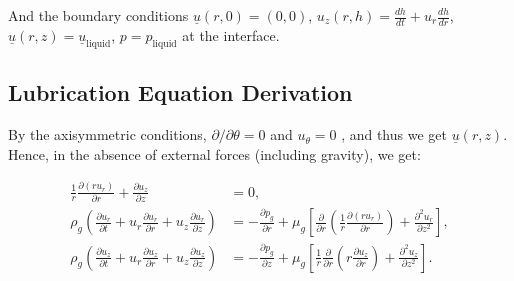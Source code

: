 \documentclass[11pt,a4paper]{article}
\begin{document}
	And the boundary conditions $\underline{u}(r,0) = (0,0)$, $u_z(r,h) = \frac{dh}{dt} + u_r \frac{dh}{dr}$, $\underline{u}(r,z) = \underline{u}_\text{liquid}$, $p = p_\text{liquid}$ at the interface.
	
	
	
	
	\subsection{Lubrication Equation Derivation}
	By the axisymmetric conditions, $\partial / \partial \theta = 0$ and $u_\theta = 0$ , and thus we get $\underline{u}(r,z)$. Hence, in the absence of external forces (including gravity), we get:
	
	\begin{subequations}\label{NavierStokesAXI}
		\begin{align}
			\frac{1}{r} \frac{\partial (r u_r)}{\partial r} + \frac{\partial u_z}{\partial z} &= 0, \label{NavierStokesAXI:continuity} \\
			\rho_g \left( \frac{\partial u_r}{\partial t} + u_r \frac{\partial u_r}{\partial r} + u_z \frac{\partial u_r}{\partial z} \right) &= -\frac{\partial p_g}{\partial r} + \mu_g \left[ \frac{\partial}{\partial r}\left( \frac{1}{r} \frac{\partial (r u_r)}{\partial r} \right) + \frac{\partial^2 u_r}{\partial z^2} \right], \label{NavierStokesAXI:r} \\
			\rho_g \left( \frac{\partial u_z}{\partial t} + u_r \frac{\partial u_z}{\partial r} + u_z \frac{\partial u_z}{\partial z} \right) &= -\frac{\partial p_g}{\partial z} + \mu_g \left[ \frac{1}{r}\frac{\partial}{\partial r}\left( r \frac{\partial u_z}{\partial r} \right) + \frac{\partial^2 u_z}{\partial z^2} \right]. \label{NavierStokesAXI:z}
		\end{align}
	\end{subequations}
	
\end{document}
